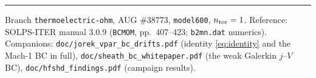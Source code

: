 \documentclass[11pt,a4paper]{article}
\newcommand{\code}[1]{\texttt{\small #1}}
\begin{document}
\vspace{1em}\hrule\vspace{0.6em}
\noindent\footnotesize
Branch \code{thermoelectric-ohm}, AUG \#38773, \code{model600}, $n_{\rm tor}=1$.
Reference: SOLPS-ITER manual 3.0.9 (\code{BCMOM}, pp.\ 407--423; \code{b2mn.dat} numerics).
Companions: \code{doc/jorek\_vpar\_bc\_drifts.pdf} (identity \eqref{eq:identity} and the
Mach-1 BC in full), \code{doc/sheath\_bc\_whitepaper.pdf} (the weak Galerkin $j$--$V$ BC),
\code{doc/hfshd\_findings.pdf} (campaign results).
\end{document}
